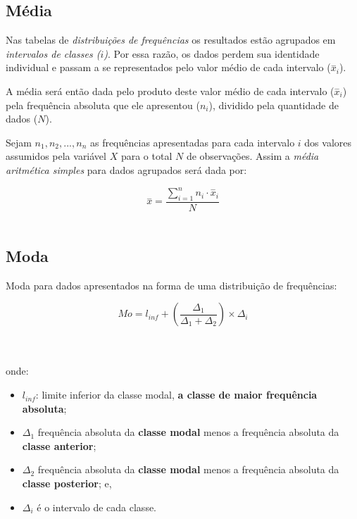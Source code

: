\documentclass[
]{book}
\providecommand{\tightlist}{%
  \setlength{\itemsep}{0pt}\setlength{\parskip}{0pt}}
\begin{document}
\hfill\break

\hypertarget{muxe9dia-1}{%
\subsection{Média}\label{muxe9dia-1}}

\hfill\break

Nas tabelas de \emph{distribuições de frequências} os resultados estão agrupados em \emph{intervalos de classes (\(i\))}. Por essa razão, os dados perdem sua identidade individual e passam a se representados pelo valor médio de cada intervalo (\(\stackrel{-}{x}_{i}\)).

A média será então dada pelo produto deste valor médio de cada intervalo (\(\stackrel{-}{x}_{i}\)) pela frequência absoluta que ele apresentou (\({n}_{i}\)), dividido pela quantidade de dados (\(N\)).

Sejam \(n_{1}, n_{2}, ..., n_{n}\) as frequências apresentadas para cada intervalo \(i\) dos valores assumidos pela variável \(X\) para o total \(N\) de observações. Assim a \emph{média aritmética simples} para dados agrupados será dada por:

\hfill\break

\[
\stackrel{-}{x}=\frac{\sum _{i=1}^{n}{n}_{i}\cdot{\stackrel{-}{x}}_{i}}{N}
\]\\

\hypertarget{moda-1}{%
\subsection{Moda}\label{moda-1}}

\hfill\break

Moda para dados apresentados na forma de uma distribuição de frequências:

\[
Mo = l_{inf} + (\frac{\Delta_{1}}{\Delta_{1} + \Delta_{2}}) \times \Delta_{i}
\]\\
\strut \\

onde:

\begin{itemize}
\tightlist
\item
  \(l_{inf}\): limite inferior da classe modal, \textbf{a classe de maior frequência absoluta};
\item
  \(\Delta_{1}\) frequência absoluta da \textbf{classe modal} menos a frequência absoluta da \textbf{classe anterior};
\item
  \(\Delta_{2}\) frequência absoluta da \textbf{classe modal} menos a frequência absoluta da \textbf{classe posterior}; e,
\item
  \(\Delta_{i}\) é o intervalo de cada classe.
\end{itemize}
\end{document}
